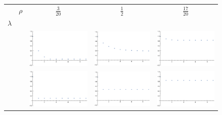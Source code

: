 \begin{figure}[h!]
\caption{\label{fig:corrFns} }
\begin{center}
 \begin{tabular}{c  c | c | c | c}
  & $\rho$ & $\frac{3}{20}$ & $\frac{1}{2}$ & $\frac{17}{20}$ \\
  $\lambda$ & & & & \\
 \hline
    \raisebox{3 em}{ $\frac{1}{10}$ } & & \includegraphics[width=0.32\linewidth]{analytics/images/exactCorrFns/lowDensLowL}  & \includegraphics[width=0.32 \linewidth]{analytics/images/exactCorrFns/midDensLowL} & \includegraphics[width=0.32 \linewidth]{analytics/images/exactCorrFns/highDensLowL} \\
    \hline
    \raisebox{3 em}{ $1$ } & &    \includegraphics[width=0.32\linewidth]{analytics/images/exactCorrFns/lowDensMidL}  & \includegraphics[width=0.32 \linewidth]{analytics/images/exactCorrFns/midDensMidL} & \includegraphics[width=0.32 \linewidth]{analytics/images/exactCorrFns/highDensMidL} \\

\end{tabular}
\end{center}
\end{figure}

